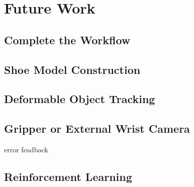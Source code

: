 \chapter{Future Work}

\section{Complete the Workflow}

\section{Shoe Model Construction}

\section{Deformable Object Tracking}

\section{Gripper or External Wrist Camera}
error feadback

\section{Reinforcement Learning}